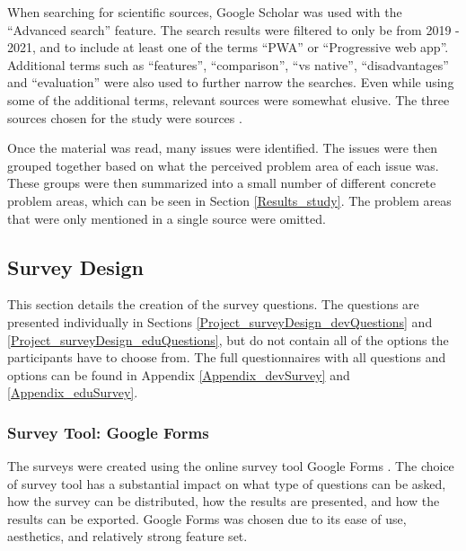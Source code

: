 \documentclass[a4paper,12pt]{article}
\begin{document}
When searching for scientific sources, Google Scholar was used with the “Advanced search” feature. The search results were filtered to only be from 2019 - 2021, and to include at least one of the terms “PWA” or “Progressive web app”. Additional terms such as “features”, “comparison”, “vs native”, “disadvantages” and “evaluation” were also used to further narrow the searches. Even while using some of the additional terms, relevant sources were somewhat elusive. The three sources chosen for the study were sources \cite{dawning_of_pwa, pwa_in_modern_webdeb, pwa_unified}.

Once the material was read, many issues were identified. The issues were then grouped together based on what the perceived problem area of each issue was. These groups were then summarized into a small number of different concrete problem areas, which can be seen in Section \ref{Results_study}. The problem areas that were only mentioned in a single source were omitted.

\subsection{Survey Design}
\label{Project_surveyDesign}
This section details the creation of the survey questions. The questions are presented individually in Sections \ref{Project_surveyDesign_devQuestions} and \ref{Project_surveyDesign_eduQuestions}, but do not contain all of the options the participants have to choose from. The full questionnaires with all questions and options can be found in Appendix \ref{Appendix_devSurvey} and \ref{Appendix_eduSurvey}.

\subsubsection{Survey Tool: Google Forms}
\label{Project_surveyDesign_googleForms}
The surveys were created using the online survey tool Google Forms \cite{google_forms}. The choice of survey tool has a substantial impact on what type of questions can be asked, how the survey can be distributed, how the results are presented, and how the results can be exported. Google Forms was chosen due to its ease of use, aesthetics, and relatively strong feature set.
\end{document}
